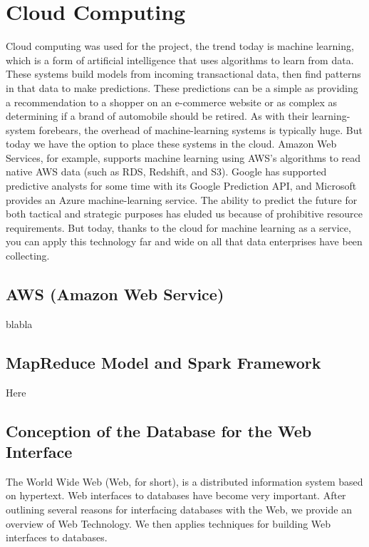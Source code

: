 \documentclass{acmtog} %
\begin{document}
\section{Cloud Computing}
\label{sec:cloud_computing}

Cloud computing was used for the project, the trend today is machine learning, which is a form of artificial intelligence that uses algorithms to learn from data. These systems build models from incoming transactional data, then find patterns in that data to make predictions. These predictions can be a simple as providing a recommendation to a shopper on an e-commerce website or as complex as determining if a brand of automobile should be retired. As with their learning-system forebears, the overhead of machine-learning systems is typically huge. But today we have the option to place these systems in the cloud. Amazon Web Services, for example, supports machine learning using AWS's algorithms to read native AWS data (such as RDS, Redshift, and S3). Google has supported predictive analysts for some time with its Google Prediction API, and Microsoft provides an Azure machine-learning service. The ability to predict the future for both tactical and strategic purposes has eluded us because of prohibitive resource requirements. But today, thanks to the cloud for machine learning as a service, you can apply this technology far and wide on all that data enterprises have been collecting.

\subsection{AWS (Amazon Web Service)}
\label{subsub:aws}

blabla

\subsection{MapReduce Model and Spark Framework}
\label{subsub:mapreduce_spark}

Here 

\subsection{Conception of the Database for the Web Interface}
\label{subsub:conception}

The World Wide Web (Web, for short), is a distributed information system based on hypertext. Web interfaces to databases have become very important. After outlining several reasons for interfacing databases with the Web, we provide an overview of Web Technology. We then applies techniques \cite{Baltas17} for building Web interfaces to databases.
\end{document}
